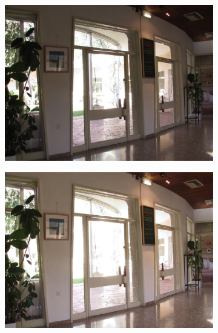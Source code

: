 \begin{figure}
\begin{subfigure}[b]{0.33\textwidth}
    \includegraphics[width=\textwidth]{figures/chapter2/exposure/bh7.jpg}
\end{subfigure}\hfill
\begin{subfigure}[b]{0.33\textwidth}
    \centering
    \includegraphics[width=\textwidth]{figures/chapter2/exposure/bh8.jpg}
\end{subfigure}\hfill
\begin{subfigure}[b]{0.33\textwidth}
    \centering

\end{subfigure}
\end{figure}

